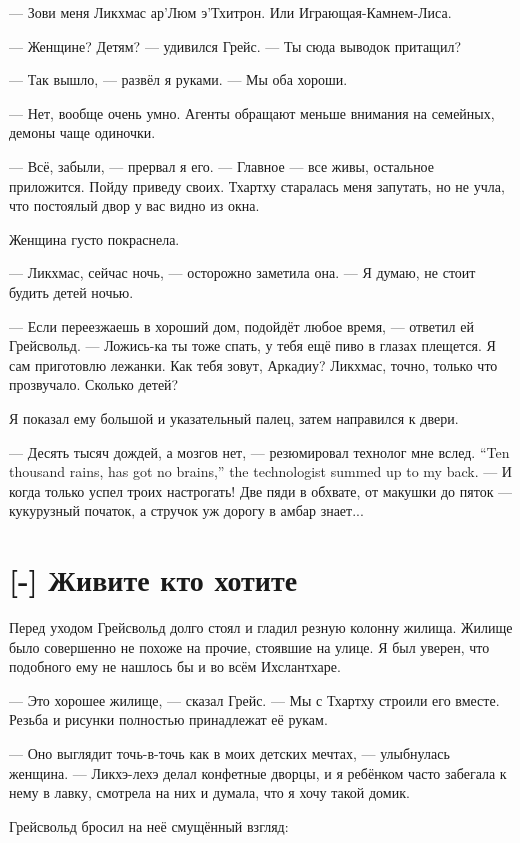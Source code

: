 --- Зови меня Ликхмас ар'Люм э'Тхитрон.
Или Играющая-Камнем-Лиса.

--- Женщине?
Детям? --- удивился Грейс.
--- Ты сюда выводок притащил?

--- Так вышло, --- развёл я руками.
--- Мы оба хороши.

--- Нет, вообще очень умно.
Агенты обращают меньше внимания на семейных, демоны чаще одиночки.

--- Всё, забыли, --- прервал я его.
--- Главное --- все живы, остальное приложится.
Пойду приведу своих.
Тхартху старалась меня запутать, но не учла, что постоялый двор у вас видно из окна.

Женщина густо покраснела.

--- Ликхмас, сейчас ночь, --- осторожно заметила она.
--- Я думаю, не стоит будить детей ночью.

--- Если переезжаешь в хороший дом, подойдёт любое время, --- ответил ей Грейсвольд.
--- Ложись-ка ты тоже спать, у тебя ещё пиво в глазах плещется.
Я сам приготовлю лежанки.
Как тебя зовут, Аркадиу?
Ликхмас, точно, только что прозвучало.
Сколько детей?

Я показал ему большой и указательный палец, затем направился к двери.

{--- Десять тысяч дождей, а мозгов нет, --- резюмировал технолог мне вслед.}
{``Ten thousand rains, has got no brains,'' the technologist summed up to my back.}
--- И когда только успел троих настрогать!
Две пяди в обхвате, от макушки до пяток --- кукурузный початок, а стручок уж дорогу в амбар знает...

\section{[-] Живите кто хотите}

Перед уходом Грейсвольд долго стоял и гладил резную колонну жилища.
Жилище было совершенно не похоже на прочие, стоявшие на улице.
Я был уверен, что подобного ему не нашлось бы и во всём Ихслантхаре.

--- Это хорошее жилище, --- сказал Грейс.
--- Мы с Тхартху строили его вместе.
Резьба и рисунки полностью принадлежат её рукам.

--- Оно выглядит точь-в-точь как в моих детских мечтах, --- улыбнулась женщина.
--- Ликхэ-лехэ делал конфетные дворцы, и я ребёнком часто забегала к нему в лавку, смотрела на них и думала, что я хочу такой домик.

Грейсвольд бросил на неё смущённый взгляд:


